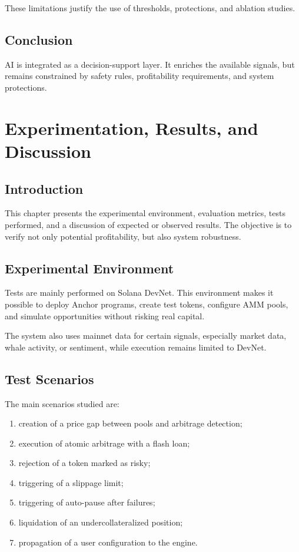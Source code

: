 \documentclass[12pt,a4paper]{report}
\begin{document}
These limitations justify the use of thresholds, protections, and ablation studies.

\section{Conclusion}

AI is integrated as a decision-support layer. It enriches the available signals, but remains constrained by safety rules, profitability requirements, and system protections.

\chapter{Experimentation, Results, and Discussion}
\label{chap:evaluation}

\section{Introduction}

This chapter presents the experimental environment, evaluation metrics, tests performed, and a discussion of expected or observed results. The objective is to verify not only potential profitability, but also system robustness.

\section{Experimental Environment}

Tests are mainly performed on Solana DevNet. This environment makes it possible to deploy Anchor programs, create test tokens, configure AMM pools, and simulate opportunities without risking real capital.

The system also uses mainnet data for certain signals, especially market data, whale activity, or sentiment, while execution remains limited to DevNet.

\section{Test Scenarios}

The main scenarios studied are:
\begin{enumerate}
    \item creation of a price gap between pools and arbitrage detection;
    \item execution of atomic arbitrage with a flash loan;
    \item rejection of a token marked as risky;
    \item triggering of a slippage limit;
    \item triggering of auto-pause after failures;
    \item liquidation of an undercollateralized position;
    \item propagation of a user configuration to the engine.
\end{enumerate}
\end{document}
